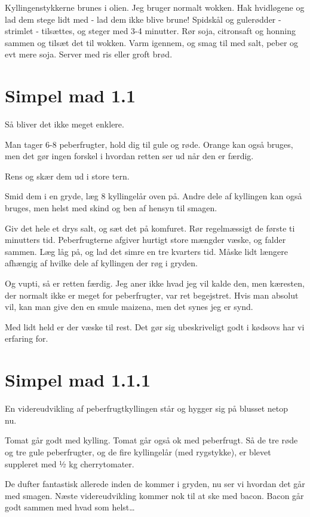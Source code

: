\documentclass[
  letterpaper,
  DIV=11,
  numbers=noendperiod]{scrreprt}
\begin{document}
Kyllingenstykkerne brunes i olien. Jeg bruger normalt wokken. Hak
hvidløgene og lad dem stege lidt med - lad dem ikke blive brune!
Spidskål og gulerødder - strimlet - tilsættes, og steger med 3-4
minutter. Rør soja, citronsaft og honning sammen og tilsæt det til
wokken. Varm igennem, og smag til med salt, peber og evt mere soja.
Server med ris eller groft brød.

\hypertarget{simpel-mad-1.1}{%
\section{Simpel mad 1.1}\label{simpel-mad-1.1}}

Så bliver det ikke meget enklere.

Man tager 6-8 peberfrugter, hold dig til gule og røde. Orange kan også
bruges, men det gør ingen forskel i hvordan retten ser ud når den er
færdig.

Rens og skær dem ud i store tern.

Smid dem i en gryde, læg 8 kyllingelår oven på. Andre dele af kyllingen
kan også bruges, men helst med skind og ben af hensyn til smagen.

Giv det hele et drys salt, og sæt det på komfuret. Rør regelmæssigt de
første ti minutters tid. Peberfrugterne afgiver hurtigt store mængder
væske, og falder sammen. Læg låg på, og lad det simre en tre kvarters
tid. Måske lidt længere afhængig af hvilke dele af kyllingen der røg i
gryden.

Og vupti, så er retten færdig. Jeg aner ikke hvad jeg vil kalde den, men
kæresten, der normalt ikke er meget for peberfrugter, var ret
begejstret. Hvis man absolut vil, kan man give den en smule maizena, men
det synes jeg er synd.

Med lidt held er der væske til rest. Det gør sig ubeskriveligt godt i
kødsovs har vi erfaring for.

\hypertarget{simpel-mad-1.1.1}{%
\section{Simpel mad 1.1.1}\label{simpel-mad-1.1.1}}

En videreudvikling af peberfrugtkyllingen står og hygger sig på blusset
netop nu.~

Tomat går godt med kylling. Tomat går også ok med peberfrugt. Så de tre
røde og tre gule peberfrugter, og de fire kyllingelår (med rygstykke),
er blevet suppleret med ½ kg cherrytomater.

De dufter fantastisk allerede inden de kommer i gryden, nu ser vi
hvordan det går med smagen. Næste videreudvikling kommer nok til at ske
med bacon. Bacon går godt sammen med hvad som helst\ldots{}
\end{document}
